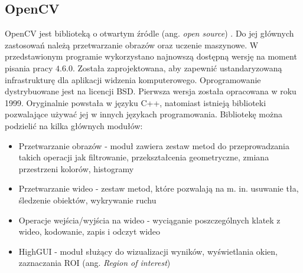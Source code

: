 \subsection{OpenCV}
OpenCV jest biblioteką o otwartym źródle (ang. \textit{open source}) \cite{open_cv,open_cv_docs} .
Do jej głównych zastosowań należą przetwarzanie obrazów oraz uczenie maszynowe.
W przedstawionym programie wykorzystano najnowszą dostępną wersję na moment pisania pracy $4.6.0$.
Została zaprojektowana, aby zapewnić ustandaryzowaną infrastrukturę dla aplikacji widzenia komputerowego.
Oprogramowanie dystrybuowane jest na licencji BSD.
Pierwsza wersja została opracowana w roku 1999.
Oryginalnie powstała w języku C++, natomiast istnieją biblioteki pozwalające używać jej w innych językach programowania.
Bibliotekę można podzielić na kilka głównych modułów:
\begin{itemize}
    \item Przetwarzanie obrazów - moduł zawiera zestaw metod do przeprowadzania takich operacji jak filtrowanie, przekształcenia geometryczne, zmiana przestrzeni kolorów, histogramy
    \item Przetwarzanie wideo - zestaw metod, które pozwalają na m. in. usuwanie tła, śledzenie obiektów, wykrywanie ruchu
    \item Operacje wejścia/wyjścia na wideo - wyciąganie poszczególnych klatek z wideo, kodowanie, zapis i odczyt wideo
    \item HighGUI - moduł służący do wizualizacji wyników, wyświetlania okien, zaznaczania ROI (ang. \textit{Region of interest})
\end{itemize}

